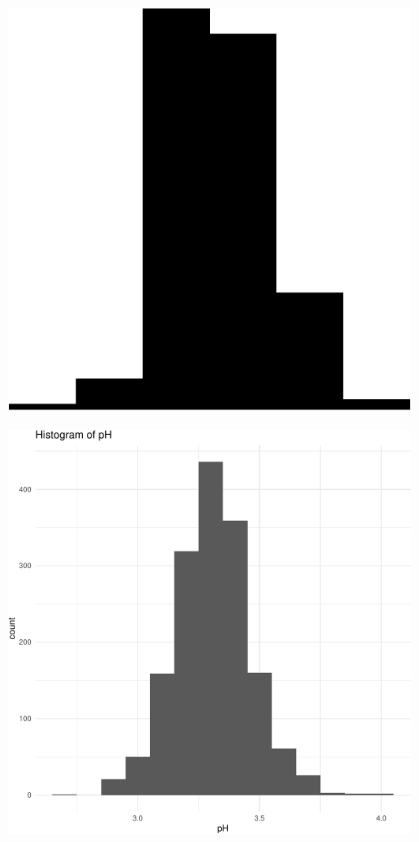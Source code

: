 \begin{frame}
\framebreak
 
\includegraphics[width=0.8\textwidth,height=0.7\textheight,keepaspectratio]{examples/ex-ggplot-04-crop.pdf}

\framebreak
 
\includegraphics[width=0.8\textwidth,height=0.7\textheight,keepaspectratio]{examples/ex-ggplot-05-crop.pdf}


\end{frame}
